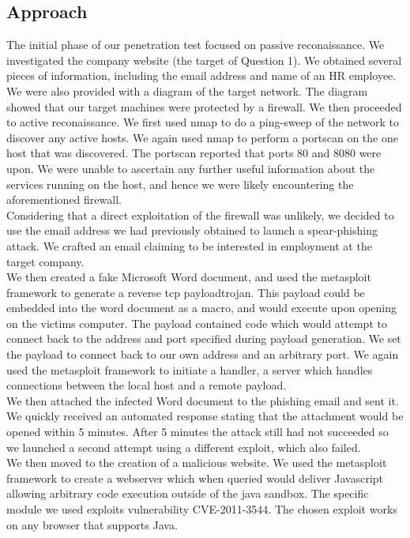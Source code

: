 \subsection{Approach}
The initial phase of our penetration test focused on passive reconaissance. We investigated the company website (the target of Question 1). We obtained several pieces of information, including the email address and name of an HR employee. We were also provided with a diagram of the target network. The diagram showed that our target machines were protected by a firewall. We then proceeded to active reconaissance. We first used nmap to do a ping-sweep of the network to discover any active hosts. We again used nmap to perform a portscan on the one host that was discovered. The portscan reported that ports 80 and 8080 were upon. We were unable to ascertain any further useful information about the services running on the host, and hence we were likely encountering the aforementioned firewall.\\
Considering that a direct exploitation of the firewall was unlikely, we decided to use the email address we had previously obtained to launch a spear-phishing attack. We crafted an email claiming to be interested in employment at the target company.\\
We then created a fake Microsoft Word document, and used the metasploit framework to generate a reverse tcp payloadtrojan. This payload could be embedded into the word document as a macro, and would execute upon opening on the victims computer. The payload contained code which would attempt to connect back to the address and port specified during payload generation. We set the payload to connect back to our own address and an arbitrary port. We again used the metasploit framework to initiate a handler, a server which handles connections between the local host and a remote payload.\\
We then attached the infected Word document to the phishing email and sent it. We quickly received an automated response stating that the attachment would be opened within 5 minutes. After 5 minutes the attack still had not succeeded so we launched a second attempt using a different exploit, which also failed.\\
We then moved to the creation of a malicious website. We used the metasploit framework to create a webserver which when queried would deliver Javascript allowing arbitrary code execution outside of the java sandbox. The specific module we used exploits vulnerability CVE-2011-3544. The chosen exploit works on any browser that supports Java.\\
